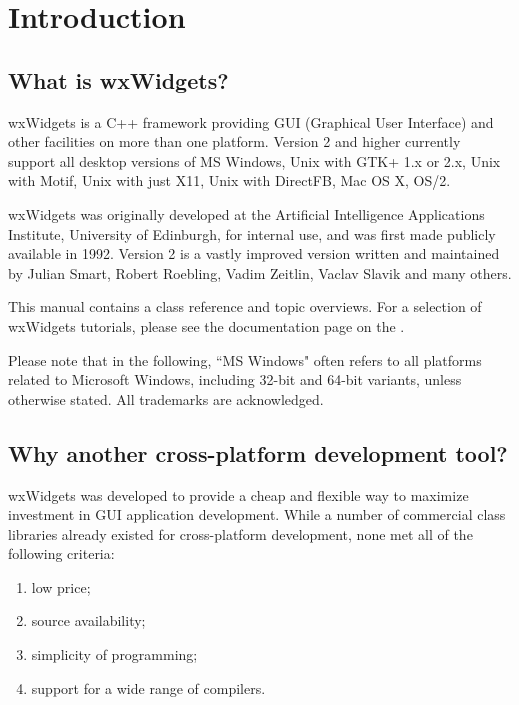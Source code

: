 \chapter{Introduction}\label{introduction}
%
%
\setfooter{\thepage}{}{}{}{}{\thepage}%

\section{What is wxWidgets?}\label{whatis}

wxWidgets is a C++ framework providing GUI (Graphical User
Interface) and other facilities on more than one platform.  Version 2 and higher
currently support all desktop versions of MS Windows, Unix with GTK+ 1.x or 2.x,
Unix with Motif, Unix with just X11, Unix with DirectFB, Mac OS X, OS/2.

wxWidgets was originally developed at the Artificial Intelligence
Applications Institute, University of Edinburgh, for internal use,
and was first made publicly available in 1992.
Version 2 is a vastly improved version written and maintained by
Julian Smart, Robert Roebling, Vadim Zeitlin, Vaclav Slavik and many others.

This manual contains a class reference and topic overviews.
For a selection of wxWidgets tutorials, please see the documentation page on the .

Please note that in the following, ``MS Windows" often refers to all
platforms related to Microsoft Windows, including 32-bit and 64-bit
variants, unless otherwise stated. All trademarks are acknowledged.

\section{Why another cross-platform development tool?}\label{why}

wxWidgets was developed to provide a cheap and flexible way to maximize
investment in GUI application development.  While a number of commercial
class libraries already existed for cross-platform development,
none met all of the following criteria:

\begin{enumerate}\itemsep=0pt
\item low price;
\item source availability;
\item simplicity of programming;
\item support for a wide range of compilers.
\end{enumerate}

